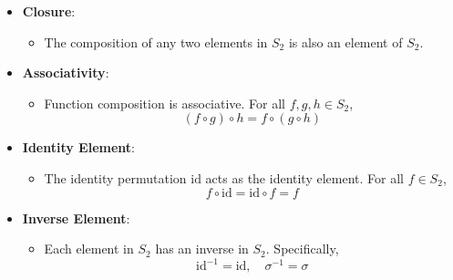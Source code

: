 \begin{itemize}
	\item \textbf{Closure}:
	\begin{itemize}
		\item The composition of any two elements in \( S_2 \) is also an element of \( S_2 \).
	\end{itemize}
	
	\item \textbf{Associativity}:
	\begin{itemize}
		\item Function composition is associative. For all \( f, g, h \in S_2 \),
		\[
		(f \circ g) \circ h = f \circ (g \circ h)
		\]
	\end{itemize}
	
	\item \textbf{Identity Element}:
	\begin{itemize}
		\item The identity permutation \(\text{id}\) acts as the identity element. For all \( f \in S_2 \),
		\[
		f \circ \text{id} = \text{id} \circ f = f
		\]
	\end{itemize}
	
	\item \textbf{Inverse Element}:
	\begin{itemize}
		\item Each element in \( S_2 \) has an inverse in \( S_2 \). Specifically,
		\[
		\text{id}^{-1} = \text{id}, \quad \sigma^{-1} = \sigma
		\]
	\end{itemize}
\end{itemize}
